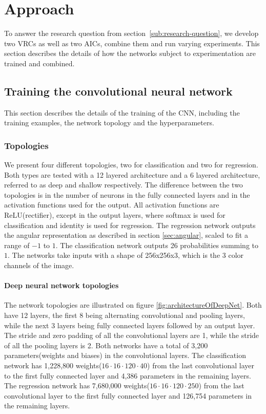 
\section{Approach}
\label{sec:approach}
To answer the research question from section~\ref{sub:research-question}, we develop two VRCs as well as two AICs, combine them and run varying experiments. This section describes the details of how the networks subject to experimentation are trained and combined.

\subsection{Training the convolutional neural network}
This section describes the details of the training of the CNN, including the training examples, the network topology and the hyperparameters. 

\subsubsection{Topologies}
\label{sec:approachtopologies}
We present four different topologies, two for classification and two for regression. Both types are tested with a 12 layered architecture and a 6 layered architecture, referred to as deep and shallow respectively. The difference between the two topologies is in the number of neurons in the fully connected layers and in the activation functions used for the output. All activation functions are ReLU(rectifier), except in the output layers, where softmax is used for classification and identity is used for regression. The regression network outputs the angular representation as described in section \ref{sec:angular}, scaled to fit a range of $-1$ to $1$. The classification network outputs 26 probabilities summing to $1$. The networks take inputs with a shape of 256x256x3, which is the 3 color channels of the image.

\paragraph{Deep neural network topologies}
The network topologies are illustrated on figure \ref{fig:architectureOfDeepNet}. Both have 12 layers, the first 8 being alternating convolutional and pooling layers, while the next 3 layers being fully connected layers followed by an output layer.  The stride and zero padding of all the convolutional layers are 1, while the stride of all the pooling layers is 2. Both networks have a total of 3,200 parameters(weights and biases) in the convolutional layers.
The classification network has 1,228,800 weights($16 \cdot 16 \cdot 120 \cdot 40$) from the last convolutional layer to the first fully connected layer and 4,386 parameters in the remaining layers.
The regression network has 7,680,000 weights($16 \cdot 16 \cdot 120 \cdot 250$) from the last convolutional layer to the first fully connected layer and 126,754 parameters in the remaining layers.

